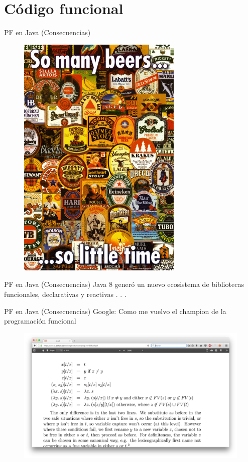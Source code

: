 \documentclass{beamer}
\begin{document}
\section{Código funcional}
\begin{frame}{PF en Java (Consecuencias)}
\begin{figure}
	\centering
	\includegraphics[width=0.45\linewidth]{Images/somany}
\end{figure}
\end{frame}

\begin{frame}{PF en Java (Consecuencias)}
\huge Java 8 generó un nuevo ecosistema de bibliotecas funcionales, declarativas y reactivas . . .
\end{frame}

\begin{frame}{PF en Java (Consecuencias)}
Google: Como me vuelvo el champion de la programación funcional
\pause
\begin{figure}
	\centering
	\includegraphics[width=\linewidth]{Images/calculus}
\end{figure}
\end{frame}
\end{document}
